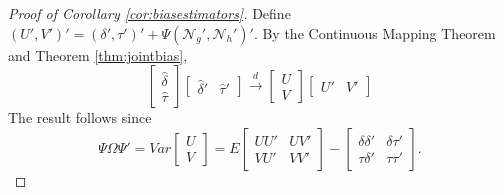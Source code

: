 \begin{proof}[Proof of Corollary \ref{cor:biasestimators}]
  Define $(U', V')' = (\delta', \tau')' + \Psi (\mathscr{N}_g', \mathscr{N}_h')'$. 
By the Continuous Mapping Theorem and Theorem \ref{thm:jointbias},
	$$\left[\begin{array}{c} \widehat{\delta} \\ \widehat{\tau} \end{array}\right]\left[\begin{array}{cc} \widehat{\delta}' & \widehat{\tau}'\end{array} \right] \overset{d}{\rightarrow} \left[\begin{array}{c} U\\V \end{array}\right]\left[\begin{array}{cc}U' & V'\end{array} \right] $$
The result follows since
$$\Psi\Omega\Psi' =Var\left[\begin{array}{c}U\\V\end{array}\right] = 
E\left[\begin{array}{cc} 
				UU'&UV'\\
				VU'&VV'
				\end{array}\right] - 
				\left[\begin{array}{cc}
				\delta\delta'&\delta\tau'\\
				\tau\delta'&\tau\tau'
				\end{array}\right].$$
\end{proof}

